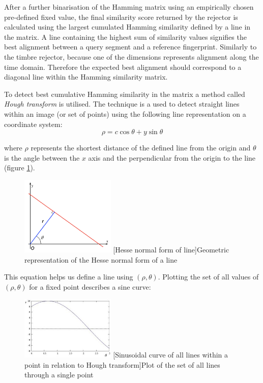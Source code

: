 After a further binarisation of the Hamming matrix using an empirically chosen
pre-defined fixed value, the final similarity score returned by the rejector is
calculated using the largest cumulated Hamming similarity defined by a line in
the matrix. A line containing the highest sum of similarity values signifies the
best alignment between a query segment and a reference fingerprint. Similarly to
the timbre rejector, because one of the dimensions represents alignment along
the time domain. Therefore the expected best alignment should correspond to a
diagonal line within the Hamming similarity matrix.

To detect best cumulative Hamming similarity in the matrix a method called
\textit{Hough transform} is utilised. The technique is a used to detect straight
lines within an image (or set of points) using the following line representation on a coordinate system:
\begin{equation}
   \rho = c \cos\theta + y \sin\theta
\end{equation}

where $\rho$ represents the shortest distance of the defined line from the
origin and $\theta$ is the angle between the $x$ axis and the perpendicular from
the origin to the line (figure \ref{fig:rthetaline}).

\begin{figure}[H]
    \centering
    \includegraphics[width=0.4\textwidth]{Algorithms/rthetaline.png}
    [Hesse normal form of line]{Geometric representation of the Hesse normal form of a line}
    \label{fig:rthetaline}
\end{figure}

This equation helps us define a line using $(\rho, \theta)$. Plotting the set of
all values of $(\rho, \theta)$ for a fixed point describes a sine curve:

\begin{figure}[H]
   \centering
   \includegraphics[width=0.4\textwidth]{Algorithms/houghlines.jpg} 
   [Sinusoidal curve of all lines within a point in relation to Hough transform]{Plot of the set of all lines through a single point}
\end{figure}

